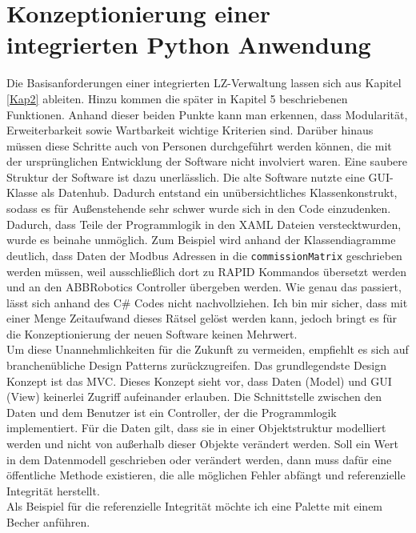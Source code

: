 

\chapter{Konzeptionierung einer integrierten Python Anwendung}\label{PythonApp}

Die Basisanforderungen einer integrierten LZ-Verwaltung lassen sich aus Kapitel \ref{Kap2} ableiten.
Hinzu kommen die später in Kapitel 5 beschriebenen Funktionen.
Anhand dieser beiden Punkte kann man erkennen, dass Modularität, Erweiterbarkeit sowie Wartbarkeit wichtige Kriterien sind.
Darüber hinaus müssen diese Schritte auch von Personen durchgeführt werden können, die mit der ursprünglichen Entwicklung
der Software nicht involviert waren.
Eine saubere Struktur der Software ist dazu unerlässlich.
Die alte Software nutzte eine GUI-Klasse als Datenhub.
Dadurch entstand ein unübersichtliches Klassenkonstrukt, sodass es für Außenstehende sehr schwer wurde sich in den Code
einzudenken.
Dadurch, dass Teile der Programmlogik in den XAML Dateien \glqq versteckt\grqq wurden, wurde es beinahe unmöglich.
Zum Beispiel wird anhand der Klassendiagramme deutlich, dass Daten der Modbus Adressen in die \verb|commissionMatrix|
geschrieben werden müssen, weil ausschließlich dort zu RAPID Kommandos übersetzt werden und an den ABBRobotics Controller
übergeben werden.
Wie genau das passiert, lässt sich anhand des C\# Codes nicht nachvollziehen.
Ich bin mir sicher, dass mit einer Menge Zeitaufwand dieses Rätsel gelöst werden kann, jedoch bringt es für die
Konzeptionierung der neuen Software keinen Mehrwert.\\
\vspace{1cm}
Um diese Unannehmlichkeiten für die Zukunft zu vermeiden, empfiehlt es sich auf branchenübliche Design Patterns zurückzugreifen.
Das grundlegendste Design Konzept ist das MVC.
Dieses Konzept sieht vor, dass Daten (Model) und GUI (View) keinerlei Zugriff aufeinander erlauben.
Die Schnittstelle zwischen den Daten und dem Benutzer ist ein Controller, der die Programmlogik implementiert.
Für die Daten gilt, dass sie in einer Objektstruktur modelliert werden und nicht von außerhalb dieser Objekte verändert
werden.
\vspace{1cm}
Soll ein Wert in dem Datenmodell geschrieben oder verändert werden, dann muss dafür eine öffentliche Methode existieren,
die alle möglichen Fehler abfängt und referenzielle Integrität herstellt. \\
Als Beispiel für die referenzielle Integrität möchte ich eine Palette mit einem Becher anführen.
